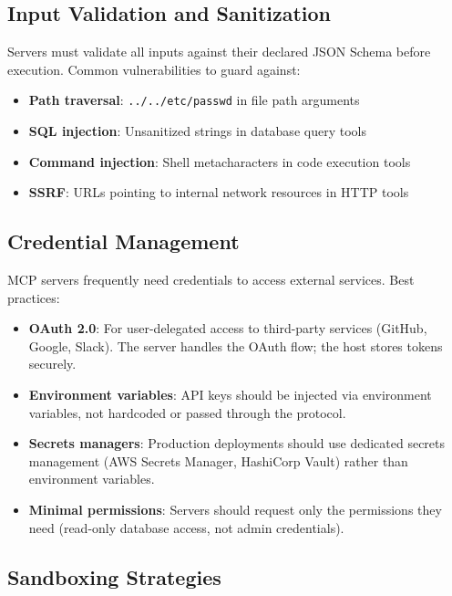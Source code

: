 \subsection{Input Validation and Sanitization}
\label{input-validation-and-sanitization}

Servers must validate all inputs against their declared JSON Schema before execution. Common vulnerabilities to guard against:

\begin{itemize}
  \item \textbf{Path traversal}: \texttt{../../etc/passwd} in file path arguments
  \item \textbf{SQL injection}: Unsanitized strings in database query tools
  \item \textbf{Command injection}: Shell metacharacters in code execution tools
  \item \textbf{SSRF}: URLs pointing to internal network resources in HTTP tools
\end{itemize}

\subsection{Credential Management}
\label{credential-management}

MCP servers frequently need credentials to access external services. Best practices:

\begin{itemize}
  \item \textbf{OAuth 2.0}: For user-delegated access to third-party services (GitHub, Google, Slack). The server handles the OAuth flow; the host stores tokens securely.
  \item \textbf{Environment variables}: API keys should be injected via environment variables, not hardcoded or passed through the protocol.
  \item \textbf{Secrets managers}: Production deployments should use dedicated secrets management (AWS Secrets Manager, HashiCorp Vault) rather than environment variables.
  \item \textbf{Minimal permissions}: Servers should request only the permissions they need (read-only database access, not admin credentials).
\end{itemize}

\subsection{Sandboxing Strategies}
\label{sandboxing-strategies}

